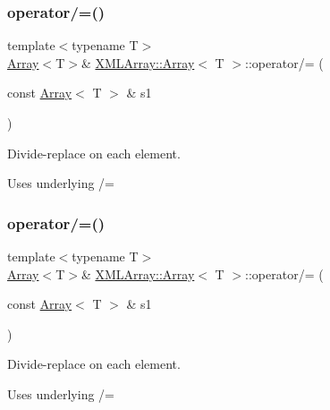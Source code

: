 \subsubsection{\texorpdfstring{operator/=()}{operator/=()}\hspace{0.1cm}{\footnotesize\ttfamily [1/4]}}
{\footnotesize\ttfamily template$<$typename T$>$ \\
\mbox{\hyperlink{classXMLArray_1_1Array}{Array}}$<$T$>$\& \mbox{\hyperlink{classXMLArray_1_1Array}{X\+M\+L\+Array\+::\+Array}}$<$ T $>$\+::operator/= (\begin{DoxyParamCaption}\item[{const \mbox{\hyperlink{classXMLArray_1_1Array}{Array}}$<$ T $>$ \&}]{s1 }\end{DoxyParamCaption})\hspace{0.3cm}{\ttfamily [inline]}}



Divide-\/replace on each element. 

Uses underlying /= \mbox{\label{classXMLArray_1_1Array_ad729e7678e412fb09104173dbe12a1fc}} 
\subsubsection{\texorpdfstring{operator/=()}{operator/=()}\hspace{0.1cm}{\footnotesize\ttfamily [2/4]}}
{\footnotesize\ttfamily template$<$typename T$>$ \\
\mbox{\hyperlink{classXMLArray_1_1Array}{Array}}$<$T$>$\& \mbox{\hyperlink{classXMLArray_1_1Array}{X\+M\+L\+Array\+::\+Array}}$<$ T $>$\+::operator/= (\begin{DoxyParamCaption}\item[{const \mbox{\hyperlink{classXMLArray_1_1Array}{Array}}$<$ T $>$ \&}]{s1 }\end{DoxyParamCaption})\hspace{0.3cm}{\ttfamily [inline]}}



Divide-\/replace on each element. 

Uses underlying /= \mbox{\label{classXMLArray_1_1Array_add7ef0354bf795511a654f1241da3318}} 
